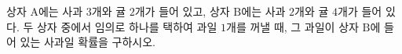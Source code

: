 상자 $\mathrm{A}$에는 사과 $3$개와 귤 $2$개가 들어 있고, 상자 $\mathrm{B}$에는 사과 $2$개와 귤 $4$개가 들어 있다. 두 상자 중에서 임의로 하나를 택하여 과일 $1$개를 꺼낼 때, 그 과일이 상자 $\mathrm{B}$에 들어 있는 사과일 확률을 구하시오.
